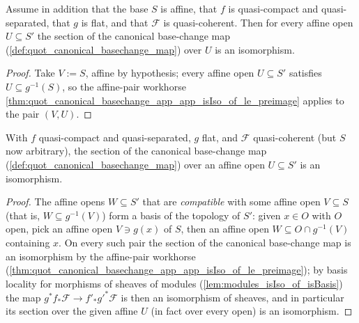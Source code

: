 \begin{theorem}

  \label{thm:quot_canonical_basechange_app_app_isIso_of_isAffineBase}
  Assume in addition that the base \(S\) is affine, that \(f\) is
  quasi-compact and quasi-separated, that \(g\) is flat, and that
  \(\mathcal{F}\) is quasi-coherent. Then for every affine open
  \(U \subseteq S'\) the section of the canonical base-change map
  (\cref{def:quot_canonical_basechange_map}) over \(U\) is an isomorphism.
\end{theorem}
\begin{proof}\leanok
  Take \(V := S\), affine by hypothesis; every affine open
  \(U \subseteq S'\) satisfies \(U \subseteq g^{-1}(S)\), so the affine-pair
  workhorse
  \cref{thm:quot_canonical_basechange_app_app_isIso_of_le_preimage}
  applies to the pair \((V, U)\).
\end{proof}

\begin{theorem}

  \label{thm:quot_canonical_basechange_app_app_isIso_of_isAffineOpen}
  With \(f\) quasi-compact and quasi-separated, \(g\) flat, and
  \(\mathcal{F}\) quasi-coherent (but \(S\) now arbitrary), the section of
  the canonical base-change map (\cref{def:quot_canonical_basechange_map})
  over an affine open \(U \subseteq S'\) is an isomorphism.
\end{theorem}
\begin{proof}\leanok
  The affine opens \(W \subseteq S'\) that are \emph{compatible} with some
  affine open \(V \subseteq S\) (that is, \(W \subseteq g^{-1}(V)\)) form a
  basis of the topology of \(S'\): given \(x \in O\) with \(O\) open, pick
  an affine open \(V \ni g(x)\) of \(S\), then an affine open
  \(W \subseteq O \cap g^{-1}(V)\) containing \(x\). On every such pair the
  section of the canonical base-change map is an isomorphism by the
  affine-pair workhorse
  (\cref{thm:quot_canonical_basechange_app_app_isIso_of_le_preimage}); by
  basis locality for morphisms of sheaves of modules
  (\cref{lem:modules_isIso_of_isBasis}) the map
  \(g^* f_* \mathcal F \to f'_* g'^* \mathcal F\) is then an isomorphism of
  sheaves, and in particular its section over the given affine \(U\) (in
  fact over every open) is an isomorphism.
\end{proof}

